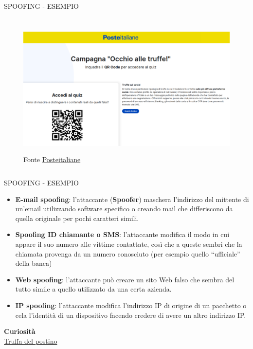 \documentclass[aspectratio=1610]{beamer}
\begin{document}
\begin{frame}{SPOOFING - ESEMPIO}
    \begin{columns}
        \column{\textwidth}
            \begin{figure}
                \href{https://www.poste.it/sicurezza-online/guide-per-operare-in-sicurezza/come-difendersi-dalle-truffe/}{\includegraphics[width=\linewidth]{img/spoofing.png}}
                \caption{{Fonte \href{https://www.poste.it/sicurezza-online/guide-per-operare-in-sicurezza/come-difendersi-dalle-truffe/}{Posteitaliane}}}
            \end{figure}
    \end{columns}
\end{frame}

\begin{frame}{SPOOFING - ESEMPIO}
    \begin{itemize}
        \item \textbf{E-mail spoofing}: l'attaccante (\textbf{Spoofer}) maschera l'indirizzo del mittente di un'email 
        utilizzando software specifico o creando mail che differiscono da quella originale per 
        pochi caratteri simili.
        \pause
        \item \textbf{Spoofing ID chiamante o SMS}: l'attaccante modifica il modo in cui appare il suo 
        numero alle vittime contattate, così che a queste sembri che la chiamata provenga da un numero 
        conosciuto (per esempio quello ``ufficiale'' della banca)
        \pause
        \item \textbf{Web spoofing}: l'attaccante può creare un sito Web falso che 
        sembra del tutto simile a quello utilizzato da una certa azienda.
        \pause
        \item \textbf{IP spoofing}: l'attaccante modifica l'indirizzo IP di origine di un pacchetto o 
        cela l'identità di un dispositivo facendo credere di avere un altro indirizzo IP. 
    \end{itemize}
    \tiny{\textbf{Curiosità}}\\
    \tiny{\href{https://www.geopop.it/una-lettera-contenente-un-qr-code-puo-svuotarvi-il-conto-come-riconoscere-la-truffa-del-postino/}{Truffa del postino}}
\end{frame}
\end{document}
